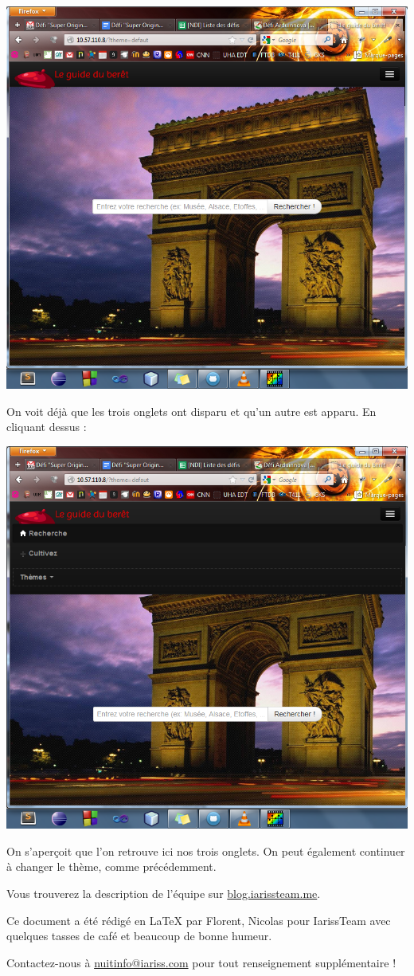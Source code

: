 \documentclass[12pt, a4paper]{article}
\newcommand{\espace}{\vspace{.8cm}}
\newcommand{\authors}{Florent, Nicolas}
\begin{document}
\begin{center}
\includegraphics[width=.9\textwidth, keepaspectratio=true]{img/accueil4.png}
\end{center}

\espace{}
On voit déjà que les trois onglets ont disparu et qu'un autre est apparu. En cliquant dessus : 

\begin{center}
\includegraphics[width=.9\textwidth, keepaspectratio=true]{img/accueil5.png}
\end{center}

\espace{}
On s'aperçoit que l'on retrouve ici nos trois onglets. On peut également continuer à changer le thème, comme précédemment.

\espace{}
\espace{}
Vous trouverez la description de l'équipe sur \href{http://blog.iarissteam.me}{blog.iarissteam.me}.

\espace\vfill{}
Ce document a été rédigé en \LaTeX{} par \authors{} pour IarissTeam avec quelques tasses de café et beaucoup de bonne humeur.

Contactez-nous à \href{mailto:nuitinfo@iariss.com}{nuitinfo@iariss.com} pour tout renseignement supplémentaire !
\end{document}
